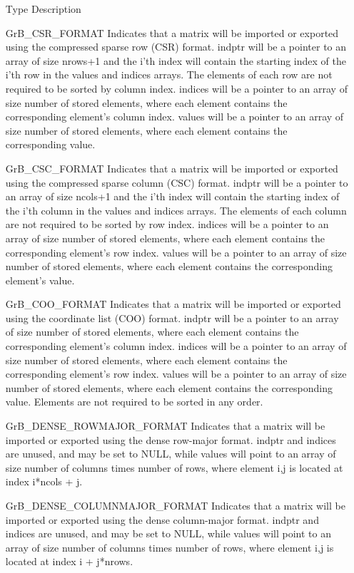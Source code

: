\begin{itemize}[leftmargin=2.1in]
  \item[Type] Description
  \item[{\sf GrB\_CSR\_FORMAT}]
Indicates that a matrix will be imported or exported using the compressed sparse
row (CSR) format.  {\sf indptr} will be a pointer to an array of size nrows+1
and the i'th index will contain the starting index of the i'th row in the {\sf values}
and {\sf indices} arrays.  The elements of each row are not required to be sorted
by column index.
{\sf indices} will be a pointer to an array of size number of
stored elements, where each element contains the corresponding element's column index.
{\sf values} will be a pointer to an array of size number of
stored elements, where each element contains the corresponding value.\\
  \item[{\sf GrB\_CSC\_FORMAT}]
Indicates that a matrix will be imported or exported using the compressed sparse
column (CSC) format.  {\sf indptr} will be a pointer to an array of size ncols+1
and the i'th index will contain the starting index of the i'th column in the {\sf values}
and {\sf indices} arrays.  The elements of each column are not required to be
sorted by row index.
{\sf indices} will be a pointer to an array of size number of
stored elements, where each element contains the corresponding element's row index.
{\sf values} will be a pointer to an array of size number of
stored elements, where each element contains the corresponding element's value.\\
  \item[{\sf GrB\_COO\_FORMAT}]
Indicates that a matrix will be imported or exported using the coordinate list
(COO) format.  {\sf indptr} will be a pointer to an array of size number of stored elements,
where each element contains the corresponding element's column index.
{\sf indices} will be a pointer to an array of size number of stored elements, where each
element contains the corresponding element's row index.
{\sf values} will be a pointer to an array of size number of
stored elements, where each element contains the corresponding value. Elements
are not required to be sorted in any order.\\
\item[{\sf GrB\_DENSE\_ROWMAJOR\_FORMAT}]     Indicates that a matrix will be imported
or exported using the dense row-major format.  {\sf indptr} and {\sf indices} are unused,
and may be set to NULL, while {\sf values} will point to an array of size number of columns
times number of rows, where element i,j is located at index i*ncols + j.\\
\item[{\sf GrB\_DENSE\_COLUMNMAJOR\_FORMAT}]     Indicates that a matrix will be imported
or exported using the dense column-major format.  {\sf indptr} and {\sf indices} are unused,
and may be set to NULL, while {\sf values} will point to an array of size number of columns
times number of rows, where element i,j is located at index i + j*nrows.\\
\end{itemize}

